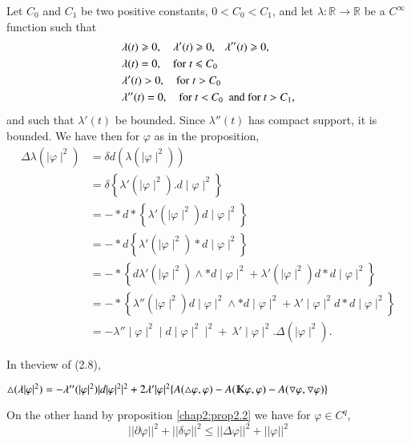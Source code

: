 \medskip
{} Let
$C_0$ and $C_1$ be 
two positive constants, $0< C_0 < C_1$, and let $\lambda :\mathbb{R}
\rightarrow \mathbb{R}$ be a  $C^\infty$ function such that 
\begin{align*}
  & \lambda (t) \geqslant 0, \quad \lambda ' (t) \geqslant
  0,~~~\lambda''(t) \geqslant 0,\\ 
  & \lambda (t) = 0, \quad {\rm for \;} t \leqslant C_0\\
  & \lambda' (t) > 0, \quad {\rm for \;} t > C_0\\
  & \lambda''(t) =0, \quad {\rm for}~ t < C_0 ~~ \text{and for}~ t>C_1,
\end{align*}
and such that $\lambda '(t)$ be bounded. Since $\lambda''(t)$ has
compact support, it is bounded. We have then for $\varphi$ as in the
proposition, 
\begin{align*}
  \Delta \lambda (\mid \varphi \mid ^2) &= \delta d (\lambda ( \mid
  \varphi \mid ^2))\\ 
  & = \delta \left\{ \lambda '( \mid \varphi \mid ^2).d \mid \varphi
  \mid ^2 \right\}  \\ 
  & = - * d * \left\{ \lambda '( \mid \varphi \mid ^2)d \mid \varphi
  \mid ^2 \right\} \\ 
  & = - * d  \left\{ \lambda '( \mid \varphi \mid ^2) * d \mid \varphi
  \mid ^2 \right\} \\  
  & = - *  \left\{ d \lambda '( \mid \varphi \mid ^2) \wedge * d \mid
  \varphi \mid ^2 + \lambda ' (\mid \varphi \mid ^2 )d * d \mid
  \varphi \mid ^2 \right\} \\ 
  & = - * \left\{ \lambda'' ( \mid \varphi \mid ^2) d  \mid \varphi \mid ^2
  \wedge * d \mid \varphi \mid ^2  + \lambda ' \mid \varphi \mid ^2 d
  * d \mid \varphi \mid ^2 \right\} \\ 
  & =  - \lambda'' \mid \varphi \mid ^2 \mid d \mid \varphi \mid ^2
  \mid ^2+~ \lambda'\mid \varphi \mid ^2 . \Delta (\mid \varphi \mid
  ^2). 
\end{align*}

In the\pageoriginale view of (2.8),

{\fontsize{10}{12}\selectfont
$\triangle
(\lambda|\varphi|^2)=-\lambda''(|\varphi|^2)|d|\varphi|^2|^2 +2
\lambda '|\varphi|^2 \{A(\triangle \varphi,\varphi)-A(\varmathbb{K}
\varphi, \varphi )-A(\triangledown \varphi, \triangledown \varphi)\}$}\relax 

On the other hand by proposition \ref{chap2:prop2.2} we have for
$\varphi \in C^q$, 
\begin{equation*} 
  ||\partial \varphi||^2+||\delta \varphi||^2 \leqslant||\Delta
  \varphi||^2+||\varphi||^2 
\end{equation*}


